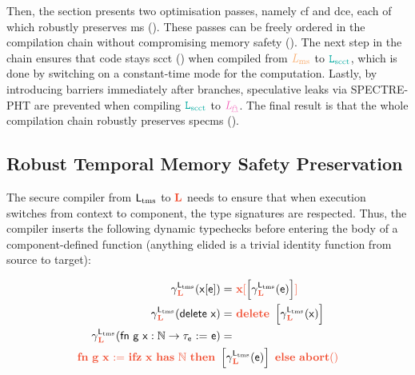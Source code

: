 \documentclass[acmsmall]{acmart}
\theoremstyle{definition}
\begin{document}
Then, the section presents two optimisation passes, namely \gls*{cf} and \gls*{dce}, each of which robustly preserves \gls*{ms} ().
These passes can be freely ordered in the compilation chain without compromising memory safety ().
The next step in the chain ensures that code stays \gls*{scct} () when compiled from $\Lms$ to $\Lscct$, which is done by switching on a constant-time mode for the computation.
Lastly, by introducing barriers immediately after branches, speculative leaks via SPECTRE-PHT are prevented when compiling $\Lscct$ to $\Lspec$.
The final result is that the whole compilation chain robustly preserves \gls*{specms} ().


\subsection{Robust Temporal Memory Safety Preservation}\label{subsec:cs:tms}

The secure compiler from $\mathsf{L_{\operatorname{tms}}}$ to $\Ltrg$ needs to ensure that when execution switches from context to component, the type signatures are respected.
Thus, the compiler inserts the following dynamic typechecks before entering the body of a component-defined function (anything elided is a trivial identity function from source to target):

\vspace{-1em}
{
\begin{gather}
  \begin{align*}%
    \cca(\src{\lget{x}{\expr}}) = &\ \lget[\trg]{\trg{x}}{\left[\cca(\src{\expr})\right]} \\
    \cca(\src{\ldelete{x}}) = &\ \ldelete[\trg]{\left[\cca(\src{x})\right]} 
    \\
    \cca(\src{\lfunction{g}{x:\natt\to\type[_{e}]}{\expr}})  =&
  \end{align*}
  \\
  \begin{align*}
\lfunction[\trg]{\trg{g}}{\trg{x}}{\lifz[\trg]{\trg{\lhast{x}{\natt}}}{
                                                            \left[\cca(\src{\expr})\right] %
                                                                                                 }{\labort[\trg]}}
  \end{align*}
\end{gather}
}
\end{document}
